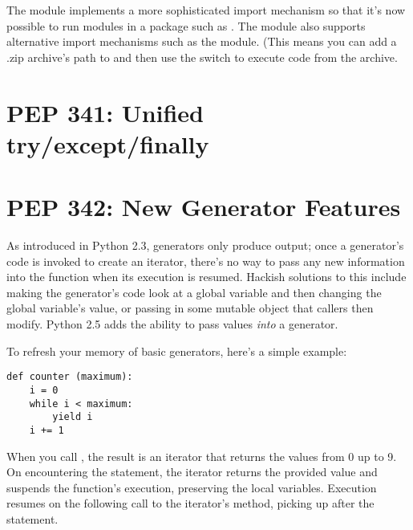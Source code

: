 \documentclass{howto}
\begin{document}
The  module implements a more sophisticated import
mechanism so that it's now possible to run modules in a package such
as .  The module also supports alternative
import mechanisms such as the  module.  (This means
you can add a .zip archive's path to  and then use the
 switch to execute code from the archive.


\begin{seealso}


\end{seealso}


\section{PEP 341: Unified try/except/finally}



\section{PEP 342: New Generator Features}

As introduced in Python 2.3, generators only produce output; once a
generator's code is invoked to create an iterator, there's no way to
pass any new information into the function when its execution is
resumed.  Hackish solutions to this include making the generator's
code look at a global variable and then changing the global variable's
value, or passing in some mutable object that callers then modify.
Python 2.5 adds the ability to pass values \emph{into} a generator.

To refresh your memory of basic generators, here's a simple example:

\begin{verbatim}
def counter (maximum):
    i = 0
    while i < maximum:
        yield i
	i += 1
\end{verbatim}

When you call , the result is an iterator that
returns the values from 0 up to 9.  On encountering the
 statement, the iterator returns the provided value and
suspends the function's execution, preserving the local variables.
Execution resumes on the following call to the iterator's 
 method, picking up after the  statement.
\end{document}
